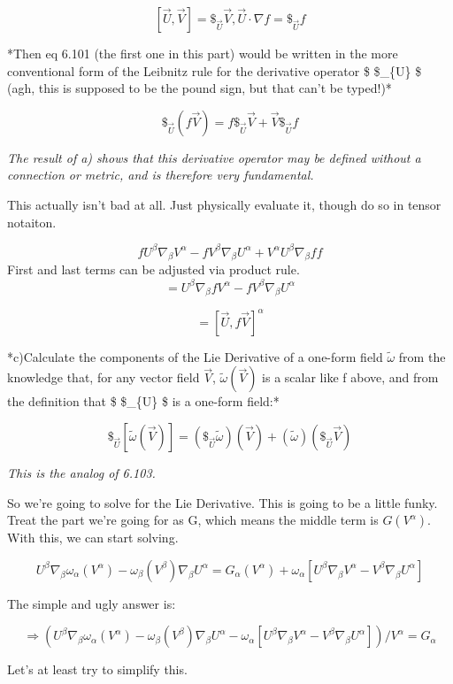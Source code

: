 \documentclass[landscape,letterpaper,10pt,english]{article}
\begin{document}
\[ [\vec U, \vec V] = \$_{\vec U} \vec V, \vec U \cdot \nabla f = \$_{\vec U} f \]

*Then eq 6.101 (the first one in this part) would be written in the more
conventional form of the Leibnitz rule for the derivative operator \$
\$\_\{\vec U\} \$ (agh, this is supposed to be the pound sign, but that
can't be typed!)*

\[ \$_{\vec U}(f\vec V) = f\$_{\vec U}\vec V + \vec V \$_{\vec U}f \]

\emph{The result of a) shows that this derivative operator may be
defined without a connection or metric, and is therefore very
fundamental.}

    This actually isn't bad at all. Just physically evaluate it, though do
so in tensor notaiton.

\[ fU^\beta \nabla_\beta V^\alpha - fV^\beta \nabla_\beta U^\alpha + V^\alpha U^\beta\nabla_\beta f f\]
First and last terms can be adjusted via product rule.
\[ = U^\beta \nabla_\beta fV^\alpha - fV^\beta \nabla_\beta U^\alpha \]

\[ = [\vec U, f\vec V]^\alpha\]

    *c)Calculate the components of the Lie Derivative of a one-form field
\(\tilde\omega\) from the knowledge that, for any vector field
\(\vec V\), \(\tilde\omega(\vec V)\) is a scalar like f above, and from
the definition that \$ \$\_\{\vec U\} \tilde\omega \$ is a one-form
field:*

\[ \$_{\vec U}[\tilde\omega(\vec V)] = (\$_{\vec U} \tilde\omega)(\vec V) + (\tilde\omega)(\$_{\vec U} \vec V) \]

\emph{This is the analog of 6.103.}

    So we're going to solve for the Lie Derivative. This is going to be a
little funky. Treat the part we're going for as G, which means the
middle term is \(G(V^\alpha)\). With this, we can start solving.

\[ U^\beta\nabla_\beta \omega_\alpha(V^\alpha) - \omega_\beta( V^\beta) \nabla_\beta  U^\alpha = G_\alpha(V^\alpha) + \omega_\alpha \left[ U^\beta \nabla_\beta V^\alpha - V^\beta \nabla_\beta U^\alpha \right]  \]

The simple and ugly answer is:

\[ \Rightarrow \left( U^\beta\nabla_\beta \omega_\alpha(V^\alpha) - \omega_\beta( V^\beta) \nabla_\beta  U^\alpha - \omega_\alpha \left[ U^\beta \nabla_\beta V^\alpha - V^\beta \nabla_\beta U^\alpha \right] \right)/V^\alpha = G_\alpha \]

Let's at least try to simplify this.
\end{document}
